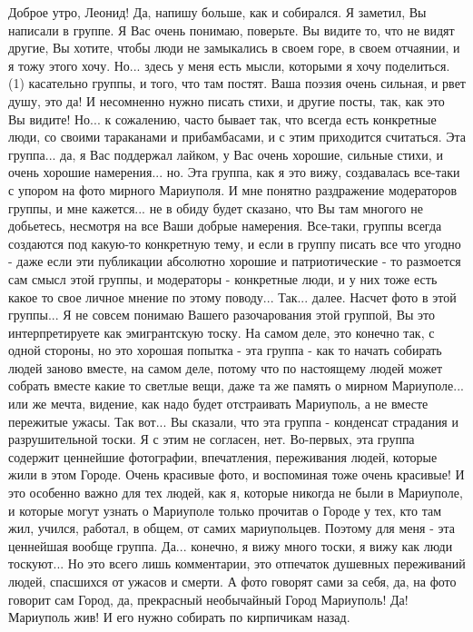 Доброе утро, Леонид! Да, напишу больше, как и собирался. Я заметил, Вы написали
в группе. Я Вас очень понимаю, поверьте. Вы видите то, что не видят другие, Вы
хотите, чтобы люди не замыкались в своем горе, в своем отчаянии, и я тожу этого
хочу. Но... здесь у меня есть мысли, которыми я хочу поделиться. (1) касательно
группы, и того, что там постят. Ваша поэзия очень сильная, и рвет душу, это да!
И несомненно нужно писать стихи, и другие посты, так, как это Вы видите! Но...
к сожалению, часто бывает так, что всегда есть конкретные люди, со своими
тараканами и прибамбасами, и с этим приходится считаться. Эта группа... да, я
Вас поддержал лайком, у Вас очень хорошие, сильные стихи, и очень хорошие
намерения... но. Эта группа, как я это вижу, создавалась все-таки с упором на
фото мирного Мариуполя. И мне понятно раздражение модераторов группы, и мне
кажется... не в обиду будет сказано, что Вы там многого не добьетесь, несмотря
на все Ваши добрые намерения. Все-таки, группы всегда создаются под какую-то
конкретную тему, и если в группу писать все что угодно - даже если эти
публикации абсолютно хорошие и патриотические - то размоется сам смысл этой
группы, и модераторы - конкретные люди, и у них тоже есть какое то свое личное
мнение по этому поводу... Так... далее. Насчет фото в этой группы... Я не
совсем понимаю Вашего разочарования этой группой, Вы это интерпретируете как
эмигрантскую тоску. На самом деле, это конечно так, с одной стороны, но это
хорошая попытка - эта группа - как то начать собирать людей заново вместе, на
самом деле, потому что по настоящему людей может собрать вместе какие то
светлые вещи, даже та же память о мирном Мариуполе... или же мечта, видение,
как надо будет отстраивать Мариуполь, а не вместе пережитые ужасы. Так вот...
Вы сказали, что эта группа - конденсат страдания и разрушительной тоски. Я с
этим не согласен, нет. Во-первых, эта группа содержит ценнейшие фотографии,
впечатления, переживания людей, которые жили в этом Городе. Очень красивые
фото, и воспоминая тоже очень красивые! И это особенно важно для тех людей, как
я, которые никогда не были в Мариуполе, и которые могут узнать о Мариуполе
только прочитав о Городе у тех, кто там жил, учился, работал, в общем, от самих
мариупольцев. Поэтому для меня - эта ценнейшая вообще группа. Да... конечно, я
вижу много тоски, я вижу как люди тоскуют... Но это всего лишь комментарии, это
отпечаток душевных переживаний людей, спасшихся от ужасов и смерти. А фото
говорят сами за себя, да, на фото говорит сам Город, да, прекрасный необычайный
Город Мариуполь! Да! Мариуполь жив! И его нужно собирать по кирпичикам назад.
